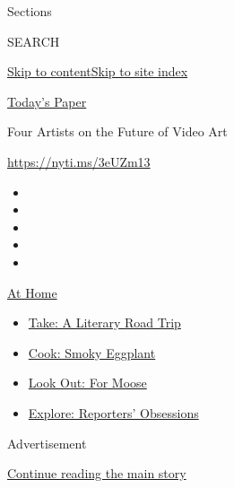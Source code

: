 Sections

SEARCH

\protect\hyperlink{site-content}{Skip to
content}\protect\hyperlink{site-index}{Skip to site index}

\href{https://myaccount.nytimes3xbfgragh.onion/auth/login?response_type=cookie\&client_id=vi}{}

\href{https://www.nytimes3xbfgragh.onion/section/todayspaper}{Today's
Paper}

Four Artists on the Future of Video Art

\url{https://nyti.ms/3eUZm13}

\begin{itemize}
\item
\item
\item
\item
\item
\end{itemize}

\href{https://www.nytimes3xbfgragh.onion/spotlight/at-home?action=click\&pgtype=Article\&state=default\&region=TOP_BANNER\&context=at_home_menu}{At
Home}

\begin{itemize}
\tightlist
\item
  \href{https://www.nytimes3xbfgragh.onion/2020/07/28/books/time-for-a-literary-road-trip.html?action=click\&pgtype=Article\&state=default\&region=TOP_BANNER\&context=at_home_menu}{Take:
  A Literary Road Trip}
\item
  \href{https://www.nytimes3xbfgragh.onion/2020/07/29/magazine/bored-with-your-home-cooking-some-smoky-eggplant-will-fix-that.html?action=click\&pgtype=Article\&state=default\&region=TOP_BANNER\&context=at_home_menu}{Cook:
  Smoky Eggplant}
\item
  \href{https://www.nytimes3xbfgragh.onion/2020/07/27/travel/moose-michigan-isle-royale.html?action=click\&pgtype=Article\&state=default\&region=TOP_BANNER\&context=at_home_menu}{Look
  Out: For Moose}
\item
  \href{https://www.nytimes3xbfgragh.onion/interactive/2020/at-home/even-more-reporters-editors-diaries-lists-recommendations.html?action=click\&pgtype=Article\&state=default\&region=TOP_BANNER\&context=at_home_menu}{Explore:
  Reporters' Obsessions}
\end{itemize}

Advertisement

\protect\hyperlink{after-top}{Continue reading the main story}

